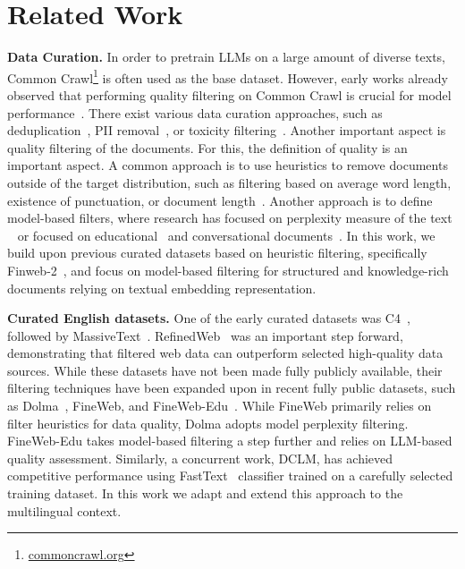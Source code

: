 \section{Related Work}
\textbf{Data Curation.} In order to pretrain LLMs on a large amount of diverse texts, Common Crawl\footnote{\href{https://commoncrawl.org/}{commoncrawl.org}} is often used as the base dataset. However, early works already observed that performing quality filtering on Common Crawl is crucial for model performance~\citep{brown2020language}. There exist various data curation approaches, such as deduplication~\citep{lee-etal-2022-deduplicating}, PII removal~\citep{subramani-etal-2023-detecting}, or toxicity filtering~\citep{arnett2024toxicity}. Another important aspect is quality filtering of the documents. For this, the definition of quality is an important aspect. A common approach is to use heuristics to remove documents outside of the target distribution, such as filtering based on average word length, existence of punctuation, or document length~\citep{rae2021scaling, raffel2020exploring}. Another approach is to define model-based filters, where research has focused on perplexity measure of the text ~\citep{wenzek2019ccnet} or focused on educational~\citep{penedo2024fineweb} and conversational documents~\citep{li2024datacomp}. In this work, we build upon previous curated datasets based on heuristic filtering, specifically Finweb-2~\citep{penedo2024fineweb-2}, and focus on model-based filtering for structured and knowledge-rich documents relying on textual embedding representation.

\textbf{Curated English datasets.} One of the early curated datasets was C4~\citep{raffel2020exploring}, followed by MassiveText~\citep{rae2021scaling}. RefinedWeb~\citep{penedo2023refinedweb} was an important step forward, demonstrating that filtered web data can outperform selected high-quality data sources. While these datasets have not been made fully publicly available, their filtering techniques have been expanded upon in recent fully public datasets, such as Dolma~\citep{soldaini2024dolma}, FineWeb, and FineWeb-Edu~\citep{penedo2024fineweb}. While FineWeb primarily relies on filter heuristics for data quality, Dolma adopts model perplexity filtering. FineWeb-Edu takes model-based filtering a step further and relies on LLM-based quality assessment. Similarly, a concurrent work, DCLM, has achieved competitive performance using FastText~\citep{joulin2017bag} classifier trained on a carefully selected training dataset. In this work we adapt and extend this approach to the multilingual context.

